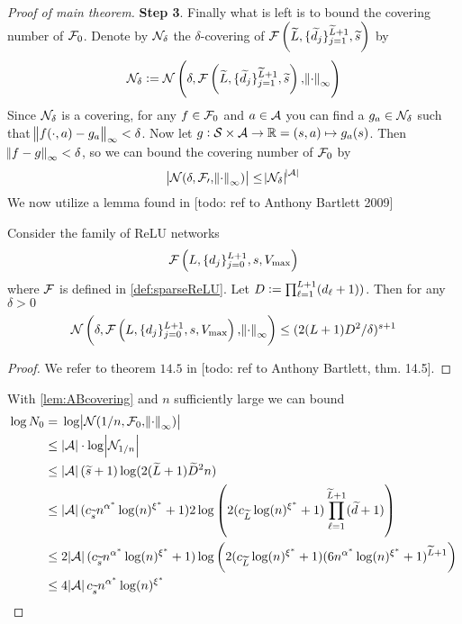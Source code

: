 \begin{proof}[Proof of main theorem]
  \textbf{Step 3}.
  Finally what is left is to bound the covering number of $\mathcal{F}_0$.
  Denote by $\mathcal{N}_\delta$ the $\delta$-covering of
  $\mathcal{F}\left( \widetilde{L}, \{ \widetilde{d}_j \}_{j=1}^{\widetilde{L} + 1}, \widetilde{s}\right)$ by
  \[ \mathcal{N}_\delta \vcentcolon= \mathcal{N} \left( \delta,
      \mathcal{F}\left(\widetilde{L}, \{ \widetilde{d}_j \}_{j=1}^{\widetilde{L} + 1}, \widetilde{s} \right),
  \norm{\cdot}_\infty \right) \]
  Since $\mathcal{N}_\delta$ is a covering, for any $f \in \mathcal{F}_0$
  and $a \in \mathcal{A}$ you can find a $g_a \in \mathcal{N}_\delta$ such that
  $\norm{f(\cdot, a) - g_a}_\infty < \delta$. Now let
  $g:\mathcal{S} \times \mathcal{A} \to \mathbb{R} = (s, a) \mapsto g_a(s)$.
  Then $\norm{f - g}_\infty < \delta$, so we can bound the covering number
  of $\mathcal{F}_0$ by
  \[ \abs{\mathcal{N}(\delta, \mathcal{F_0},  \norm{\cdot}_\infty)}
  \leq \abs{\mathcal{N}_\delta}^{\abs{\mathcal{A}}} \]
  We now utilize a lemma found in [todo: ref to Anthony Bartlett 2009]
  \begin{lem}
    Consider the family of ReLU networks
    \[ \mathcal{F}\left(L, \{d_j\}_{j=0}^{L+1}, s, V_{\max}\right) \]
    where $\mathcal{F}$ is defined in \cref{def:sparseReLU}.
  Let $D \vcentcolon= \prod_{\ell=1}^{L+1} (d_\ell + 1))$. Then for any $\delta > 0$
  \[ \mathcal{N} \left(\delta,
      \mathcal{F}\left(L, \{d_j\}_{j=0}^{L+1}, s, V_{\max}\right),
  \norm{\cdot}_\infty \right) \leq (2 (L+1) D^2 / \delta)^{s + 1} \]
  \label{lem:ABcovering}
  \end{lem}
  \begin{proof}
    We refer to theorem $14.5$ in [todo: ref to Anthony Bartlett, thm. 14.5].
  \end{proof}
  With \cref{lem:ABcovering} and $n$ sufficiently large we can bound
  \begin{align*}
    \log N_0 = & \; \log \abs{\Cal{N}(1/n, \Cal{F}_0, \norm{\cdot}_\infty)}
    \\ \leq & \; \abs{\Cal{A}} \cdot \log \abs{\Cal{N}_{1/n}}
    \\ \leq & \; \abs{\Cal{A}} (\wt{s} + 1) \log (2 (\wt{L} + 1) \wt{D}^2 n)
    \\ \leq & \; \abs{\Cal{A}} (c_{\wt{s}} n^{\alpha^*} \log(n)^{\xi^*} + 1)
    2 \log \left(2 (c_{\wt{L}} \log(n)^{\xi^*} + 1) \prod_{\ell=1}^{\wt{L} + 1}
    (\wt{d} + 1) \right)
    \\ \leq & \; 2 \abs{\Cal{A}} (c_{\wt{s}} n^{\alpha^*} \log(n)^{\xi^*} + 1)
    \log \left(2 (c_{\wt{L}} \log(n)^{\xi^*} + 1)
    (6 n^{\alpha^*} \log(n)^{\xi^*} + 1)^{\wt{L} + 1} \right)
    \\ \leq & \; 4 \abs{\Cal{A}} c_{\wt{s}} n^{\alpha^*} \log(n)^{\xi^*}

\end{align*}
\end{proof}
